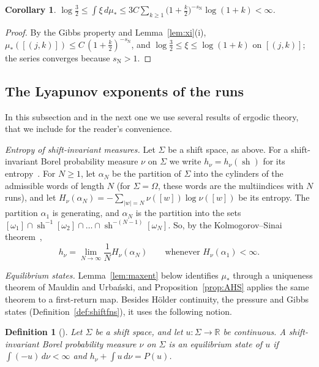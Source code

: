 \documentclass[11pt]{amsart}
\newtheorem{corollary}[proposition]{Corollary}
\newtheorem{definition}[proposition]{Definition}
\theoremstyle{definition}
\theoremstyle{remark}
\newcommand{\R}{\mathbb R}
\newcommand{\sN}{s_{\mathrm N}}
\newcommand{\abs}[1]{\lvert #1\rvert}
\begin{document}
\begin{corollary}\label{lem:intxi}
$\log\frac32\le\int\xi\,d\mu_*\le3C\sum_{k\ge1}\bigl(1+\frac k2\bigr)^{-\sN}\log(1+k)<\infty$.
\end{corollary}

\begin{proof}
By the Gibbs property and Lemma~\ref{lem:xi}(i), $\mu_*([(j,k)])\le C\,(1+\frac k2)^{-\sN}$, and $\log\frac32\le\xi\le\log(1+k)$ on $[(j,k)]$; the series converges because $\sN>1$.
\end{proof}

\subsection*{The Lyapunov exponents of the runs}
In this subsection and in the next one we use several results of ergodic theory, that we include for the reader's convenience.

\emph{Entropy of shift-invariant measures.}
Let $\Sigma$ be a shift space, as above. For a shift-invariant Borel probability measure $\nu$ on $\Sigma$ we write $h_\nu=h_\nu(\operatorname{sh})$ for its entropy~\cite[App.~1]{MU03}. For $N\ge1$, let $\alpha_N$ be the partition of $\Sigma$ into the cylinders of the admissible words of length $N$ (for $\Sigma=\Omega$, these words are the multiindices with $N$ runs), and let $H_\nu(\alpha_N)=-\sum_{\abs w=N}\nu([w])\log\nu([w])$ be its entropy. The partition $\alpha_1$ is generating, and $\alpha_N$ is the partition into the sets $[\omega_1]\cap\operatorname{sh}^{-1}[\omega_2]\cap\dots\cap\operatorname{sh}^{-(N-1)}[\omega_N]$. So, by the Kolmogorov--Sinai theorem~\cite[Thm.~A1.0.9]{MU03},
\begin{equation}\label{eq:KS}
  h_\nu=\lim_{N\to\infty}\frac1NH_\nu(\alpha_N)\qquad\text{whenever }H_\nu(\alpha_1)<\infty .
\end{equation}

\emph{Equilibrium states.}
Lemma~\ref{lem:maxent} below identifies $\mu_*$ through a uniqueness theorem of Mauldin and Urba\'nski, and Proposition~\ref{prop:AHS} applies the same theorem to a first-return map. Besides H\"older continuity, the pressure and Gibbs states (Definition~\ref{def:shiftfns}), it uses the following notion.

\begin{definition}[{\cite[\S2.2]{MU03}}]\label{def:equilibrium}
Let $\Sigma$ be a shift space, and let $u:\Sigma\to\R$ be continuous. A shift-invariant Borel probability measure $\nu$ on $\Sigma$ is an \emph{equilibrium state} of $u$ if $\int(-u)\,d\nu<\infty$ and $h_\nu+\int u\,d\nu=P(u)$.
\end{definition}
\end{document}
